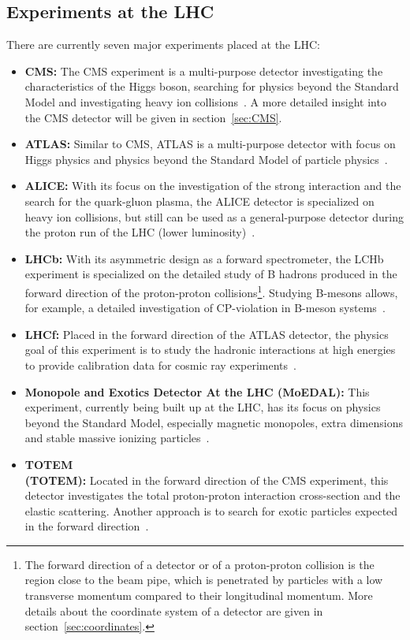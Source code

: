\subsection{Experiments at the \ac{LHC}}
There are currently seven major experiments placed at the \ac{LHC}:
\begin{itemize}
\item \textbf{\acf{CMS}:} The \ac{CMS} experiment is a multi-purpose detector investigating the characteristics of the Higgs boson, searching for physics beyond the Standard Model and investigating heavy ion collisions~\cite{C+08}. A more detailed insight into the \ac{CMS} detector will be given in section~\ref{sec:CMS}.
\item \textbf{\ac{ATLAS}:} Similar to \ac{CMS}, ATLAS is a multi-purpose detector with focus on Higgs physics and physics beyond the Standard Model of particle physics~\cite{A+08a}.
\item \textbf{\ac{ALICE}:} With its focus on the investigation of the strong interaction and the search for the quark-gluon plasma, the ALICE detector is specialized on heavy ion collisions, but still can be used as a general-purpose detector during the proton run of the \ac{LHC} (lower luminosity)~\cite{A+08b}.
\item \textbf{\ac{LHCb}:} With its asymmetric design as a forward spectrometer, the LCHb experiment is specialized on the detailed study of B hadrons produced in the forward direction of the proton-proton collisions\footnote{The forward direction of a detector or of a proton-proton collision is the region close to the beam pipe, which is penetrated by particles with a low transverse momentum compared to their longitudinal momentum. More details about the coordinate system of a detector are given in section~\ref{sec:coordinates}.}. Studying B-mesons allows, for example, a detailed investigation of CP-violation in B-meson systems~\cite{A+08d}.
\item \textbf{\ac{LHCf}:} Placed in the forward direction of the \ac{ATLAS} detector, the physics goal of this experiment is to study the hadronic interactions at high energies to provide calibration data for cosmic ray experiments~\cite{A+08e}.
\item \textbf{Monopole and Exotics Detector At the LHC (MoEDAL):} This experiment, currently being built up at the \ac{LHC}, has its focus on physics beyond the Standard Model, especially magnetic monopoles, extra dimensions and stable massive ionizing particles~\cite{Pin14}.
\item \textbf{\acl{TOTEM}}\\ \textbf{(\acs{TOTEM}):} Located in the forward direction of the \ac{CMS} experiment, this detector investigates the total proton-proton interaction cross-section and the elastic scattering. Another approach is to search for exotic particles expected in the forward direction~\cite{A+08f}.
\end{itemize}




